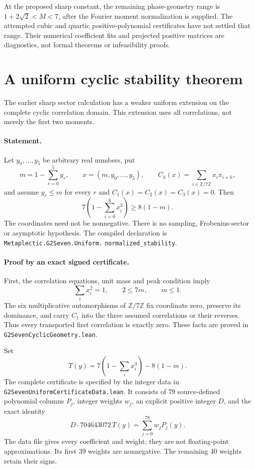 \documentclass[11pt]{article}
\newcommand{\ZZ}{\mathbb Z}
\begin{document}
At the proposed sharp constant, the remaining phase-geometry range is
\(1+2\sqrt2<M<7\), after the
Fourier moment normalization is supplied. The attempted cubic and
quartic positive-polynomial certificates have not settled that range.
Their numerical coefficient fits and projected positive matrices are
diagnostics, not formal theorems or infeasibility proofs.

\section{A uniform cyclic stability theorem}

The earlier sharp sector calculation has a weaker uniform extension
on the complete cyclic correlation domain. This extension uses all
correlations, not merely the first two moments.

\paragraph{Statement.}
Let \(y_0,\ldots,y_5\) be arbitrary real numbers, put
\[
 m=1-\sum_{r=0}^5y_r,\qquad
 x=(m,y_0,\ldots,y_5),\qquad
 C_h(x)=\sum_{i\in\ZZ/7\ZZ}x_ix_{i+h},
\]
and assume \(y_r\le m\) for every \(r\) and
\(C_1(x)=C_2(x)=C_3(x)=0\). Then
\begin{equation}\label{eq:uniform-eight}
 7\left(1-\sum_{i=0}^6x_i^3\right)\ge8(1-m).
\end{equation}
The coordinates need not be nonnegative. There is no sampling,
Frobenius-sector or asymptotic hypothesis. The compiled declaration is
\texttt{Metaplectic.G2Seven.Uniform.}\allowbreak
\texttt{normalized\_stability}.

\paragraph{Proof by an exact signed certificate.}
First, the correlation equations, unit mass and peak condition imply
\[
 \sum_i x_i^2=1,\qquad 2\le7m,\qquad m\le1.
\]
The six multiplicative automorphisms of \(\ZZ/7\ZZ\) fix coordinate zero,
preserve its dominance, and carry \(C_1\) into the three assumed
correlations or their reverses. Thus every transported first
correlation is exactly zero. These facts are proved in
\texttt{G2SevenCyclicGeometry.lean}.

Set
\[
 T(y)=7\left(1-\sum_i x_i^3\right)-8(1-m).
\]
The complete certificate is specified by the integer data in
\texttt{G2SevenUniformCertificateData.lean}. It consists of
\(79\) source-defined polynomial columns \(P_j\), integer weights
\(w_j\), an explicit positive integer \(D\), and the exact identity
\begin{equation}\label{eq:uniform-eight-certificate}
 D\cdot704643072\,T(y)=\sum_{j=0}^{78}w_jP_j(y).
\end{equation}
The data file gives every coefficient and weight; they are not
floating-point approximations. Its first \(39\) weights are
nonnegative. The remaining \(40\) weights retain their signs.
\end{document}
